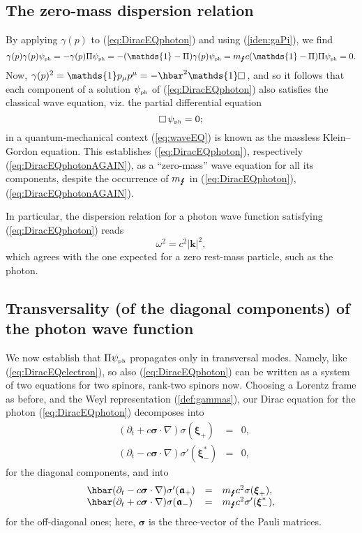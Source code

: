 \documentclass[12pt]{article}
\theoremstyle{definition}
\newcommand{\refeq}[1]{(\ref{#1})}
\newcommand{\vect}[1] {\boldsymbol{{ #1}} }
\newcommand{\kV}{{\vect{k}}}		%
\numberwithin{equation}{section}
\newcommand{\fa}{\mathfrak{a}}
\newcommand{\bfa}{\boldsymbol{\fa}}
\newcommand{\beq}{\begin{equation}}
\newcommand{\eeq}{\end{equation}}
\newcommand{\Id}{\mathds{1}}
\newcommand{\p}{\partial}
\newcommand{\siV}{\boldsymbol{\sigma}}
\newcommand{\xiV}{{\boldsymbol{\xi}}}
\newcommand{\psiPH}{{\psi_{\mbox{\rm\tiny ph}}}}
\newcommand{\mPH}{{m_{\mbox{\Lightning}}}}
\newcommand{\ga}{\gamma}
\newcommand{\si}{\sigma}
\newcommand{\nab}{\nabla}
\newcommand{\dal}{\raisebox{3pt}{\fbox{}}\,}
\begin{document}
\subsection{The zero-mass dispersion relation}
%
By applying $\ga(p)$ to  \refeq{eq:DiracEQphoton} and using \refeq{iden:gaPi}, we find
\beq 
\ga(p)\ga(p)\psiPH = - \ga(p)\Pi \psiPH = - (\Id - \Pi) \ga(p) \psiPH = \mPH c (\Id - \Pi)\Pi \psiPH = 0.
\eeq
 Now, $\ga(p)^2 = \Id p_\mu p^\mu  = - \hbar^2 \Id \dal$, and so it follows that each component of a solution $\psiPH$ of \refeq{eq:DiracEQphoton} 
also satisfies the classical wave equation, viz. the partial differential equation
\beq \label{eq:waveEQ}
\dal\psiPH=0;
\eeq
in a quantum-mechanical context \refeq{eq:waveEQ} is known as the massless Klein--Gordon equation.
 This establishes (\ref{eq:DiracEQphoton}), respectively (\ref{eq:DiracEQphotonAGAIN}),
 as a ``zero-mass'' wave equation for all its components, 
despite the occurrence of $\mPH$ in (\ref{eq:DiracEQphoton}), (\ref{eq:DiracEQphotonAGAIN}).
 
 In particular, the dispersion relation for a photon wave function satisfying (\ref{eq:DiracEQphoton}) reads
\beq \label{dispREL}
\omega^2 = c^2|\kV|^2,
\eeq
which agrees with the one expected for a zero rest-mass particle, such as the photon. 
%
\subsection{Transversality (of the diagonal components) of the photon wave function} 
%
We now establish that $\Pi\psiPH$ propagates only in transversal modes.
 Namely, like (\ref{eq:DiracEQelectron}), so also (\ref{eq:DiracEQphoton}) can be written 
as a system of two equations for two spinors, rank-two spinors now.
  Choosing a Lorentz frame as before, and  the Weyl representation \refeq{def:gammas}, 
our Dirac equation for the photon (\ref{eq:DiracEQphoton}) decomposes into
\beq 
\begin{array}{lcl}\label{DIRACeqSPLITdiag}
\phantom{\hbar} (\p_t + c\siV\cdot\nab)\si(\xiV_+) \!\!&=&\!\! 0, \\
\phantom{\hbar} (\p_t - c\siV\cdot\nab)\si'(\xiV_-^*) \!\!&=&\!\! 0,
\end{array}
\eeq
for the diagonal components, and into
\beq 
\begin{array}{lcl}\label{DIRACeqSPLIToffDIAG}
\hbar (\p_t - c\siV\cdot\nab) \si'(\bfa_+) & = & \mPH c^2\si (\xiV_+),\\
\hbar (\p_t + c\siV\cdot\nab) \si (\bfa_-) & = & \mPH c^2\si'(\xiV_-^*),
\end{array}
\eeq
for the off-diagonal ones; here, $\siV$ is the three-vector of the Pauli matrices.
\end{document}
